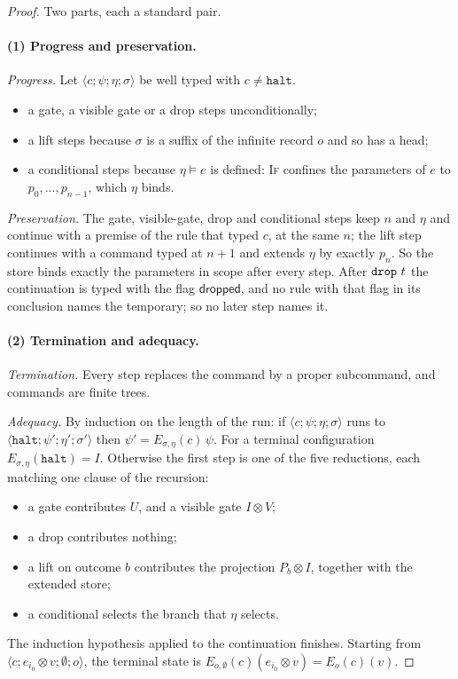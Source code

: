\documentclass[acmsmall,screen,review,anonymous,nonacm]{acmart}
\begin{document}
\begin{proof}
Two parts, each a standard pair.

\paragraph{(1) Progress and preservation.}
\emph{Progress.} Let $\langle c;\psi;\eta;\sigma\rangle$ be well typed with
$c \ne \texttt{halt}$.
\begin{itemize}
\item a gate, a visible gate or a drop steps unconditionally;
\item a lift steps because $\sigma$ is a suffix of the infinite record $o$
  and so has a head;
\item a conditional steps because $\eta \models e$ is defined: \textsc{If}
  confines the parameters of $e$ to $p_0, \ldots, p_{n-1}$, which $\eta$
  binds.
\end{itemize}

\emph{Preservation.} The gate, visible-gate, drop and conditional steps keep
$n$ and $\eta$ and continue with a premise of the rule that typed $c$, at the
same $n$; the lift step continues with a command typed at $n+1$ and extends
$\eta$ by exactly $p_n$. So the store binds exactly the parameters in scope
after every step. After $\texttt{drop}\ t$ the continuation is typed with the flag
$\mathsf{dropped}$, and no rule with that flag in its conclusion names the
temporary; so no later step names it.

\paragraph{(2) Termination and adequacy.}
\emph{Termination.} Every step replaces the command by a proper subcommand,
and commands are finite trees.

\emph{Adequacy.} By induction on the length of the run: if $\langle
c;\psi;\eta;\sigma\rangle$ runs to $\langle \texttt{halt};
\psi';\eta';\sigma'\rangle$ then $\psi' = E_{\sigma,\eta}(c)\,\psi$. For a
terminal configuration $E_{\sigma,\eta}(\texttt{halt}) = I$. Otherwise the
first step is one of the five reductions, each matching one clause of the
recursion:
\begin{itemize}
\item a gate contributes $U$, and a visible gate $I \otimes V$;
\item a drop contributes nothing;
\item a lift on outcome $b$ contributes the projection $P_b \otimes I$,
  together with the extended store;
\item a conditional selects the branch that $\eta$ selects.
\end{itemize}
The induction hypothesis applied to the continuation finishes. Starting from
$\langle c; e_{i_0} \otimes v; \emptyset; o\rangle$, the terminal state is
$E_{o,\emptyset}(c)(e_{i_0} \otimes v) = E_o(c)(v)$.


\end{proof}
\end{document}

